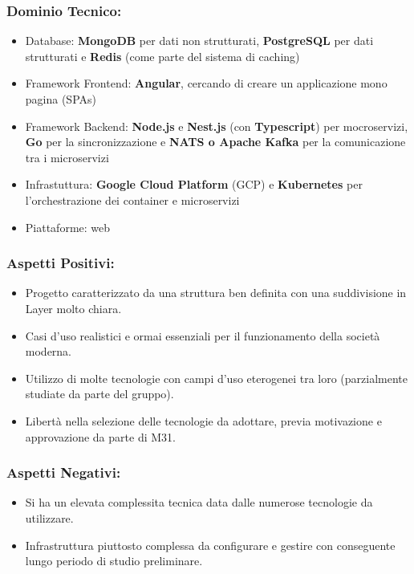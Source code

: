 \documentclass[a4paper,12pt]{article}
\begin{document}
\subsubsection*{Dominio Tecnico:}
\begin{itemize}
    \item Database: \textbf{MongoDB} per dati non strutturati, \textbf{PostgreSQL} per dati strutturati e \textbf{Redis} (come parte del sistema di caching)
    \item Framework Frontend: \textbf{Angular}, cercando di creare un applicazione mono pagina (SPAs)
    \item Framework Backend: \textbf{Node.js} e \textbf{Nest.js} (con \textbf{Typescript}) per mocroservizi, \textbf{Go} per la sincronizzazione e \textbf{NATS o Apache Kafka} per la comunicazione tra i microservizi
    \item Infrastuttura: \textbf{Google Cloud Platform} (GCP) e \textbf{Kubernetes} per l'orchestrazione dei container e microservizi
    \item Piattaforme: web
\end{itemize}
\subsubsection*{Aspetti Positivi:}
\begin{itemize}
    \item Progetto caratterizzato da una struttura ben definita con una suddivisione in Layer molto chiara.
    \item Casi d’uso realistici e ormai essenziali per il funzionamento della società moderna.
    \item Utilizzo di molte tecnologie con campi d'uso eterogenei tra loro (parzialmente studiate da parte del gruppo).
    \item Libertà nella selezione delle tecnologie da adottare, previa motivazione e approvazione da parte di M31.
\end{itemize}

\subsubsection*{Aspetti Negativi:}
\begin{itemize}
    \item Si ha un elevata complessita tecnica data dalle numerose tecnologie da utilizzare.
    \item Infrastruttura piuttosto complessa da configurare e gestire con conseguente lungo periodo di studio preliminare.
\end{itemize}
\end{document}
